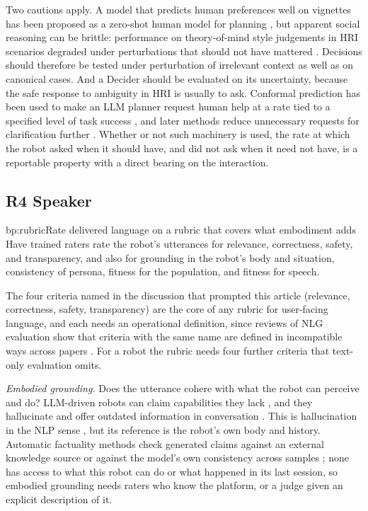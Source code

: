 Two cautions apply. A model that predicts human preferences well on
vignettes has been proposed as a zero-shot human model for planning
\cite{zhang2023largeb}, but apparent social reasoning can be brittle:
performance on theory-of-mind style judgements in HRI scenarios degraded
under perturbations that should not have mattered \cite{verma2024theory}.
Decisions should therefore be tested under perturbation of irrelevant
context as well as on canonical cases. And a Decider should be evaluated on
its uncertainty, because the safe response to ambiguity in HRI is usually to
ask. Conformal prediction has been used to make an LLM planner request human
help at a rate tied to a specified level of task success
\cite{ren2023robots}, and later methods reduce unnecessary requests for
clarification further \cite{liang2024introspective,mullen2025lbap}. Whether or not such machinery is used, the rate at
which the robot asked when it should have, and did not ask when it need not
have, is a reportable property with a direct bearing on the interaction.

\subsection{R4 Speaker}

\begin{practice}{bp:rubric}{Rate delivered language on a rubric that covers what embodiment adds}
Have trained raters rate the robot's utterances for relevance, correctness,
safety, and transparency, and also for grounding in the robot's body and
situation, consistency of persona, fitness for the population, and fitness
for speech.
\end{practice}

The four criteria named in the discussion that prompted this article
(relevance, correctness, safety, transparency) are the core of any rubric
for user-facing language, and each needs an operational definition, since
reviews of NLG evaluation show that criteria with the same name are defined
in incompatible ways across papers \cite{howcroft2020twenty}. For a robot
the rubric needs four further criteria that text-only evaluation omits.

\emph{Embodied grounding.} Does the utterance cohere with what the robot can
perceive and do? LLM-driven robots can claim capabilities they lack
\cite{ashok2026why}, and they hallucinate and offer outdated information in
conversation \cite{irfan2025between}. This is hallucination in the
NLP sense \cite{ji2023survey}, but its reference is the robot's own body and
history. Automatic factuality methods check generated claims against an
external knowledge source \cite{min2023factscore} or against the model's
own consistency across samples
\cite{manakul2023selfcheckgpt,farquhar2024detecting}; none has access to
what this robot can do or what happened in its last session, so embodied
grounding needs raters who know the platform, or a judge given an explicit
description of it.

